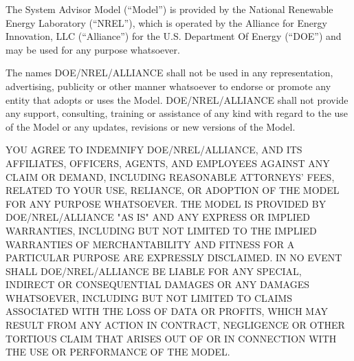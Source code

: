 \documentclass{scrartcl} %
\newcommand{\+}{\discretionary{\mbox{\scriptsize$\hookleftarrow$}}{}{}}
\begin{document}
The System Advisor Model (``Model'') is provided by the National Renewable Energy Laboratory (``NREL''), which is operated by the Alliance for Energy Innovation, LLC (``Alliance'') for the U.S. Department Of Energy (``DOE'') and may be used for any purpose whatsoever.  

The names DOE/NREL/ALLIANCE shall not be used in any representation, advertising, publicity or other manner whatsoever to endorse or promote any entity that adopts or uses the Model.  DOE/NREL/ALLIANCE shall not provide any support, consulting, training or assistance of any kind with regard to the use of the Model or any updates, revisions or new versions of the Model.

YOU AGREE TO INDEMNIFY DOE/NREL/ALLIANCE, AND ITS AFFILIATES, OFFICERS, AGENTS, AND EMPLOYEES AGAINST ANY CLAIM OR DEMAND, INCLUDING REASONABLE ATTORNEYS' FEES, RELATED TO YOUR USE, RELIANCE, OR ADOPTION OF THE MODEL FOR ANY PURPOSE WHATSOEVER.  THE MODEL IS PROVIDED BY DOE/NREL/ALLIANCE "AS IS" AND ANY EXPRESS OR IMPLIED WARRANTIES, INCLUDING BUT NOT LIMITED TO THE IMPLIED WARRANTIES OF MERCHANTABILITY AND FITNESS FOR A PARTICULAR PURPOSE ARE EXPRESSLY DISCLAIMED.  IN NO EVENT SHALL DOE/NREL/ALLIANCE BE LIABLE FOR ANY SPECIAL, INDIRECT OR CONSEQUENTIAL DAMAGES OR ANY DAMAGES WHATSOEVER, INCLUDING BUT NOT LIMITED TO CLAIMS ASSOCIATED WITH THE LOSS OF DATA OR PROFITS, WHICH MAY RESULT FROM ANY ACTION IN CONTRACT, NEGLIGENCE OR OTHER TORTIOUS CLAIM THAT ARISES OUT OF OR IN CONNECTION WITH THE USE OR PERFORMANCE OF THE MODEL.
\end{document}
